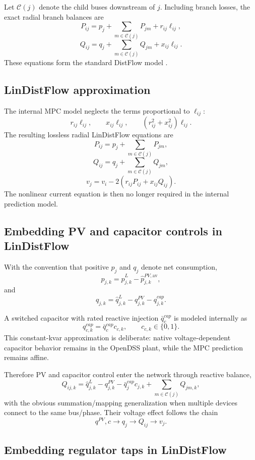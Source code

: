 Let $\mathcal C(j)$ denote the child buses downstream of $j$.  Including branch losses,
the exact radial branch balances are
\[
\boxed{
P_{ij}
=
p_j
+
\sum_{m\in\mathcal C(j)}
P_{jm}
+
r_{ij}\ell_{ij},
}
\]
\[
\boxed{
Q_{ij}
=
q_j
+
\sum_{m\in\mathcal C(j)}
Q_{jm}
+
x_{ij}\ell_{ij}.
}
\]
These equations form the standard DistFlow model
\cite{baran1989sizing}.

\subsection{LinDistFlow approximation}
\label{subsec:p1_lindist}

The internal MPC model neglects the terms proportional to $\ell_{ij}$:
\[
r_{ij}\ell_{ij},
\qquad
x_{ij}\ell_{ij},
\qquad
(r_{ij}^2+x_{ij}^2)\ell_{ij}.
\]
The resulting lossless radial LinDistFlow equations are
\[
\boxed{
P_{ij}
=
p_j
+
\sum_{m\in\mathcal C(j)}
P_{jm},
}
\]
\[
\boxed{
Q_{ij}
=
q_j
+
\sum_{m\in\mathcal C(j)}
Q_{jm},
}
\]
\[
\boxed{
v_j
=
v_i
-
2(r_{ij}P_{ij}+x_{ij}Q_{ij}).
}
\]
The nonlinear current equation is then no longer required in the internal prediction
model.

\subsection{Embedding PV and capacitor controls in LinDistFlow}
\label{subsec:p1_lindist_devices}

With the convention that positive $p_j$ and $q_j$ denote net consumption,
\[
p_{j,k}
=
\hat p_{j,k}^{L}
-
\hat p_{j,k}^{PV,\mathrm{av}},
\]
and
\[
q_{j,k}
=
\hat q_{j,k}^{L}
-
q_{j,k}^{PV}
-
q_{j,k}^{cap}.
\]

A switched capacitor with rated reactive injection $\bar q_c^{cap}$ is modeled internally
as
\[
q_{c,k}^{cap}
=
\bar q_c^{cap}c_{c,k},
\qquad
c_{c,k}\in\{0,1\}.
\]
This constant-kvar approximation is deliberate: native voltage-dependent capacitor
behavior remains in the OpenDSS plant, while the MPC prediction remains affine.

Therefore PV and capacitor control enter the network through reactive balance,
\[
Q_{ij,k}
=
\hat q_{j,k}^{L}
-
q_{j,k}^{PV}
-
\bar q_j^{cap}c_{j,k}
+
\sum_{m\in\mathcal C(j)}
Q_{jm,k},
\]
with the obvious summation/mapping generalization when multiple devices connect to the
same bus/phase.  Their voltage effect follows the chain
\[
q^{PV},c
\longrightarrow
q_j
\longrightarrow
Q_{ij}
\longrightarrow
v_j.
\]

\subsection{Embedding regulator taps in LinDistFlow}
\label{subsec:p1_reg_lindist}

